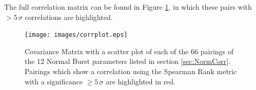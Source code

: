 The full correlation matrix can be found in Figure \ref{fig:corr}, in which these pairs with $>5\,\sigma$ correlations are highlighted.

\begin{figure}
  \centering
  \texttt{[image: images/corrplot.eps]}
  \caption{\small Covariance Matrix with a scatter plot of each of the 66 pairings of the 12 Normal Burst parameters listed in section \ref{sec:NormCorr}.  Pairings which show a correlation using the Spearman Rank metric with a significance $\geq5\,\sigma$ are highlighted in red.}
  \label{fig:corr}
\end{figure}

